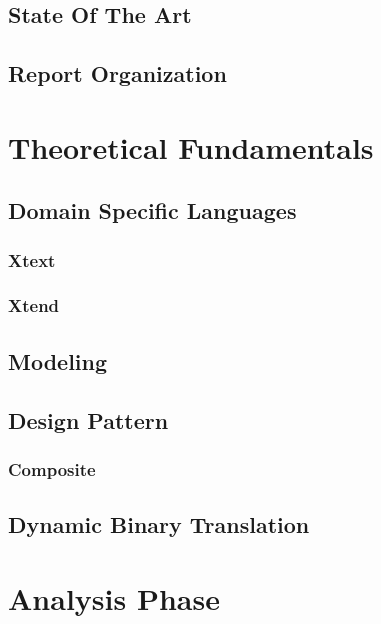 \documentclass{report}
\begin{document}
    \subsection{State Of The Art}
    
    \subsection{Report Organization}
    
    \section{Theoretical Fundamentals}
    
    \subsection{Domain Specific Languages}
    
    \subsubsection{Xtext}
    
    \subsubsection{Xtend}
    
    \subsection{Modeling}
    
    \subsection{Design Pattern}
    
    \subsubsection{Composite}
    
    \subsection{Dynamic Binary Translation}

	\section{Analysis Phase}
    
\end{document}
